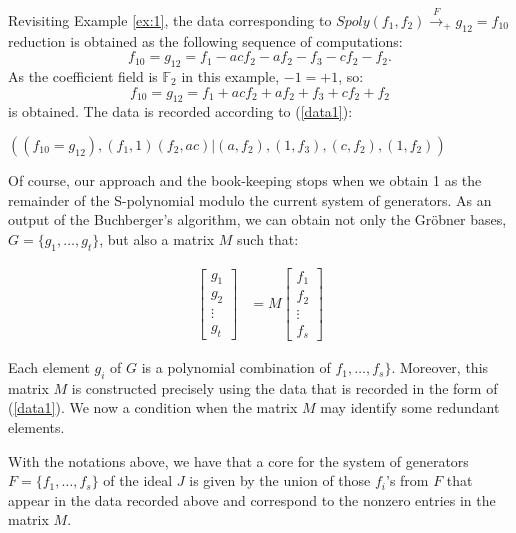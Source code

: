 \begin{example}
Revisiting Example \ref{ex:1},  the data corresponding to
$Spoly(f_1,f_2)\xrightarrow{F}_+  g_{12} = f_{10}$ reduction is
obtained as the following sequence of computations:
$$f_{10}=g_{12}=f_1-acf_2-af_2-f_3-cf_2-f_2.$$ As the coefficient
field is $\mathbb{F}_2$ in this example, $-1 = +1$, so:
$$f_{10}=g_{12}=f_1+acf_2+af_2+f_3+cf_2+f_2$$ is obtained.
The data is recorded according to (\ref{data1}):

\begin{center}
$((f_{10}=g_{12}), (f_1,1)(f_2,ac)|(a,f_2),(1,f_3),(c,f_2),(1,f_2))$
\end{center}

\end{example}

Of course, our approach and the book-keeping stops when we obtain
1 as the remainder of the S-polynomial modulo the current system of
generators. As an output of the Buchberger's algorithm, we can obtain
not only the Gr\"obner bases,  $G = \{g_1,\ldots,g_t\}$, but also a
matrix $M$ such that: 
\begin{center}
\begin{align}
   \begin{bmatrix}
           g_{1} \\
           g_{2} \\
           \vdots \\
           g_{t}
         \end{bmatrix}
    &= M \begin{bmatrix}
           f_{1} \\
           f_{2} \\
           \vdots \\
           f_{s}
         \end{bmatrix}
  \end{align}

\end{center}

Each element $g_i$ of $G$ is a polynomial combination of $f_1, \dots,
f_s\}$. Moreover, this matrix $M$ is constructed precisely using the
data that is recorded in the form of (\ref{data1}). We now a condition
when the matrix $M$ may identify some redundant elements. 


\begin{theorem}
\label{thm}
With the notations above, we have that a core for the system of
generators $F = \{f_1,\dots,f_s\}$ of the ideal $J$ is given by the
union of those $f_i$'s from $F$ that appear in the data recorded above
and correspond to the nonzero entries in the matrix $M$.  
\end{theorem}


